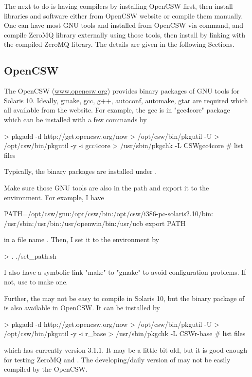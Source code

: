 The next to do is having compilers by installing OpenCSW first, then
install libraries and software either from OpenCSW website or compile
them manually. One can have most GNU tools and  installed
from OpenCSW via  command, and compile ZeroMQ library externally
using those tools, then install  by linking with the compiled
ZeroMQ library. The details are given in the following Sections.


\subsection[OpenCSW]{OpenCSW}
\label{sec:opencsw}
The OpenCSW (\url{www.opencsw.org}) provides binary packages of GNU tools
for Solaris 10. Ideally, gmake, gcc, g++, autoconf, automake, gtar are
required which all available from the website. For example, the gcc is in
"gcc4core" package which can be installed with a few 
commands by
\begin{Code}
> pkgadd -d http://get.opencsw.org/now
> /opt/csw/bin/pkgutil -U
> /opt/csw/bin/pkgutil -y -i gcc4core 
> /usr/sbin/pkgchk -L CSWgcc4core # list files
\end{Code}
Typically, the binary packages are installed under
.

Make sure those GNU tools are also in the path and export it to
the environment. For example, I have
\begin{Code}
PATH=/opt/csw/gnu:/opt/csw/bin:/opt/csw/i386-pc-solaris2.10/bin:
/usr/sbin:/usr/bin:/usr/openwin/bin:/usr/ucb
export PATH
\end{Code}
in a file name . Then, I set it to the environment by
\begin{Code}
> . ./set_path.sh
\end{Code}
I also have a symbolic link "make" to "gmake" to avoid configuration problems.
If not, use  to make one.

Further, the  may not be easy to compile in Solaris 10, but the
binary package of  is also available in OpenCSW. It can be
installed by
\begin{Code}
> pkgadd -d http://get.opencsw.org/now
> /opt/csw/bin/pkgutil -U
> /opt/csw/bin/pkgutil -y -i r_base 
> /usr/sbin/pkgchk -L CSWr-base # list files
\end{Code}
which has currently  version 3.1.1. It may be a little bit old,
but it is good enough for testing ZeroMQ and .
The developing/daily version of  may not be easily compiled
by the OpenCSW.


